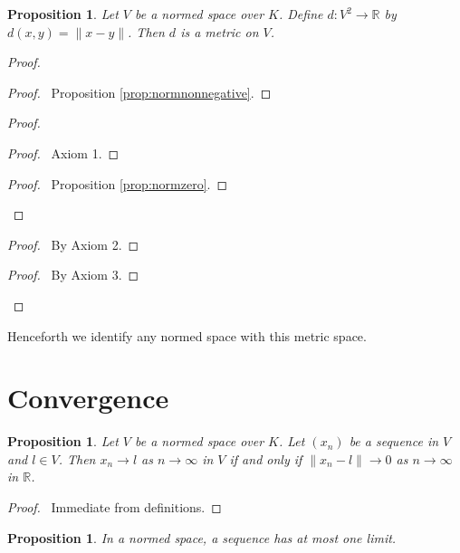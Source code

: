 \documentclass{book}
\let\qed\relax
\newtheorem{prop}[ax]{Proposition}
\theoremstyle{definition}
\begin{document}
\begin{prop}
Let $V$ be a normed space over $K$. Define $d : V^2 \rightarrow \mathbb{R}$ by $d(x,y) = \| x-y\|$. Then $d$ is a metric on $V$.
\end{prop}

\begin{proof}
\pf
{}
\begin{proof}
	\pf\ Proposition \ref{prop:normnonnegative}.
\end{proof}
\begin{proof}
	\begin{proof}
		\pf\ Axiom 1.
	\end{proof}
	\begin{proof}
		\pf\ Proposition \ref{prop:normzero}.
	\end{proof}
\end{proof}
\begin{proof}
	\pf\ By Axiom 2.
\end{proof}
\begin{proof}
	\pf\ By Axiom 3.
\end{proof}
\qed
\end{proof}

Henceforth we identify any normed space with this metric space.

\section{Convergence}

\begin{prop}
Let $V$ be a normed space over $K$. Let $(x_n)$ be a sequence in $V$ and $l \in V$. Then $x_n \rightarrow l$ as $n \rightarrow \infty$ in $V$ if and only if $\| x_n - l \| \rightarrow 0$ as $n \rightarrow \infty$ in $\mathbb{R}$.
\end{prop}

\begin{proof}
\pf\ Immediate from definitions. \qed
\end{proof}

\begin{prop}
\label{prop:onelimit}
In a normed space, a sequence has at most one limit.
\end{prop}
\end{document}
